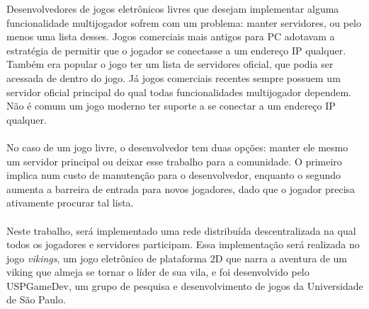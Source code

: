 \documentclass[11pt,twoside,a4paper]{book}
\begin{document}
Desenvolvedores de jogos eletrônicos livres que desejam implementar alguma
funcionalidade multijogador sofrem com um problema: manter servidores, ou pelo
menos uma lista desses. Jogos comerciais mais antigos para PC adotavam a
estratégia de permitir que o jogador se conectasse a um endereço IP qualquer.
Também era popular o jogo ter um lista de servidores oficial, que podia ser
acessada de dentro do jogo. Já jogos comerciais recentes sempre possuem um
servidor oficial principal do qual todas funcionalidades multijogador dependem.
Não é comum um jogo moderno ter suporte a se conectar a um endereço IP qualquer.
\\
\\
No caso de um jogo livre, o desenvolvedor tem duas opções: manter ele mesmo um
servidor principal ou deixar esse trabalho para a comunidade. O primeiro implica
num custo de manutenção para o desenvolvedor, enquanto o segundo aumenta a
barreira de entrada para novos jogadores, dado que o jogador precisa ativamente
procurar tal lista.
\\
\\
Neste trabalho, será implementado uma rede distribuída descentralizada na qual
todos os jogadores e servidores participam. Essa implementação será realizada no
jogo \textit{vikings}, um jogo eletrônico de plataforma 2D que narra a aventura
de um viking que almeja se tornar o líder de sua vila, e foi desenvolvido pelo
USPGameDev, um grupo de pesquisa e desenvolvimento de jogos da Universidade de
São Paulo.


\def\cyclic#1{\langle #1 \rangle}

\newcommand\definicao[2]{
    \stepcounter{defcnt}
    \vspace{0.5cm}
    \vbox{
    \textbf{Definição \thedefcnt \hspace{1cm} #1} \\ #2
    \begin{center}
        $ \square $
    \end{center}
}
}
\newcommand\notacao{
    \textbf{Notação} \hspace{0.2cm}
}

\tableofcontents    %
\end{document}
